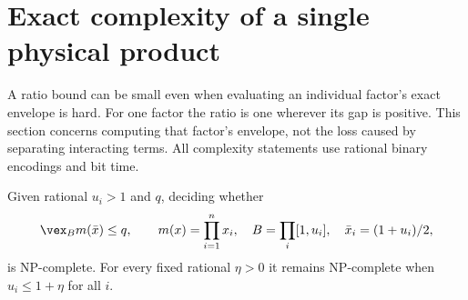 \section{Exact complexity of a single physical product}\label{sec:single-product}
A ratio bound can be small even when evaluating an individual factor's
exact envelope is hard. For one factor the ratio is one wherever its gap
is positive. This section concerns computing that factor's envelope, not
the loss caused by separating interacting terms. All complexity
statements use rational binary encodings and bit time.

\begin{theorem}
\label{thm:single-product-hardness}
Given rational $u_i>1$ and $q$, deciding whether
\[
 \vex_B m(\bar x)\le q,\qquad m(x)=\prod_{i=1}^nx_i,
 \quad B=\prod_i[1,u_i],\quad \bar x_i=(1+u_i)/2,
\]
is NP-complete. For every fixed rational $\eta>0$ it remains
NP-complete when $u_i\le1+\eta$ for all $i$.
\end{theorem}

